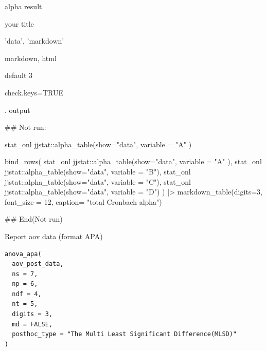 \documentclass[a4paper]{book}
\begin{document}
%
\begin{Arguments}
\begin{ldescription}
\item[\code{alpha\_data\_res}] alpha result

\item[\code{title}] your title

\item[\code{show}] 'data', 'markdown'

\item[\code{format}] markdown, html

\item[\code{digits}] default 3

\item[\code{check.keys}] check.keys=TRUE

\item[\code{variable}] . output
\end{ldescription}
\end{Arguments}
%
\begin{Examples}
\begin{ExampleCode}
\#\# Not run: 

stat_onl %
   jjstat::alpha_table(show="data", variable = "A" )


bind_rows(
 stat_onl %
   jjstat::alpha_table(show="data", variable = "A" ),
 stat_onl %
   jjstat::alpha_table(show="data", variable = "B"),
 stat_onl %
   jjstat::alpha_table(show="data", variable = "C"),
 stat_onl %
   jjstat::alpha_table(show="data", variable = "D")
) |> markdown_table(digits=3, font_size = 12,
                   caption= "total Cronbach alpha")

## End(Not run)




\end{ExampleCode}
\end{Examples}
%
\begin{Description}
Report aov data (format APA)
\end{Description}
%
\begin{Usage}
\begin{verbatim}
anova_apa(
  aov_post_data,
  ns = 7,
  np = 6,
  ndf = 4,
  nt = 5,
  digits = 3,
  md = FALSE,
  posthoc_type = "The Multi Least Significant Difference(MLSD)"
)
\end{verbatim}
\end{Usage}
\end{document}
